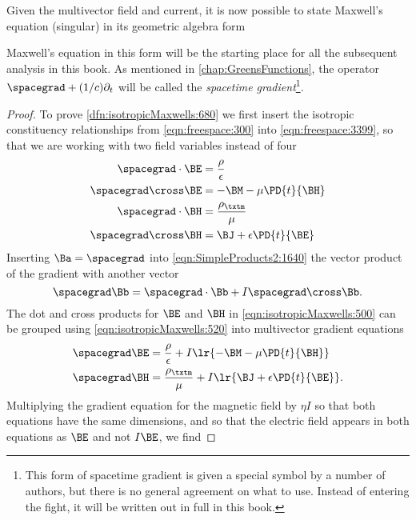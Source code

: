 Given the multivector field and current, it is now possible to state Maxwell's equation (singular) in its geometric algebra form

Maxwell's equation in this form will be the starting place for all the subsequent analysis in this book.
As mentioned in \cref{chap:GreensFunctions}, the operator \( \spacegrad + (1/c) \partial_t \) will be called the \textit{spacetime gradient}\footnote{This form of spacetime gradient is given a special symbol by a number of authors, but there is no general agreement on what to use.
Instead of entering the fight, it will be written out in full in this book.}.
\begin{proof}
To prove \cref{dfn:isotropicMaxwells:680} we
first insert the
isotropic
constituency relationships from \cref{eqn:freespace:300} into
\cref{eqn:freespace:3399}, so that we are working with two field variables instead of four
\begin{equation}\label{eqn:isotropicMaxwells:500}
\begin{aligned}
\spacegrad \cdot \BE &= \frac{\rho}{\epsilon} \\
\spacegrad \cross \BE &= - \BM - \mu \PD{t}{\BH} \\
\spacegrad \cdot \BH &= \frac{\rho_\txtm}{\mu} \\
\spacegrad \cross \BH &= \BJ + \epsilon \PD{t}{\BE}
\end{aligned}
\end{equation}
Inserting \( \Ba = \spacegrad \) into \cref{eqn:SimpleProducts2:1640} the vector product of the gradient with another vector
\begin{equation}\label{eqn:isotropicMaxwells:520}
\spacegrad \Bb = \spacegrad \cdot \Bb + I \spacegrad \cross \Bb.
\end{equation}
The dot and cross products for \( \BE \) and \( \BH \) in
\cref{eqn:isotropicMaxwells:500}
can be grouped using \cref{eqn:isotropicMaxwells:520} into multivector gradient equations
\begin{equation}\label{eqn:isotropicMaxwells:540}
\begin{aligned}
\spacegrad \BE &= \frac{\rho}{\epsilon} + I \lr{ - \BM - \mu \PD{t}{\BH} } \\
\spacegrad \BH &= \frac{\rho_\txtm}{\mu} + I \lr{ \BJ + \epsilon \PD{t}{\BE} }.
\end{aligned}
\end{equation}
Multiplying the gradient equation for the magnetic field by \( \eta I \) so that both equations have the same dimensions, and so that the electric field appears in both equations as \( \BE \) and not \( I \BE \), we find

\end{proof}
